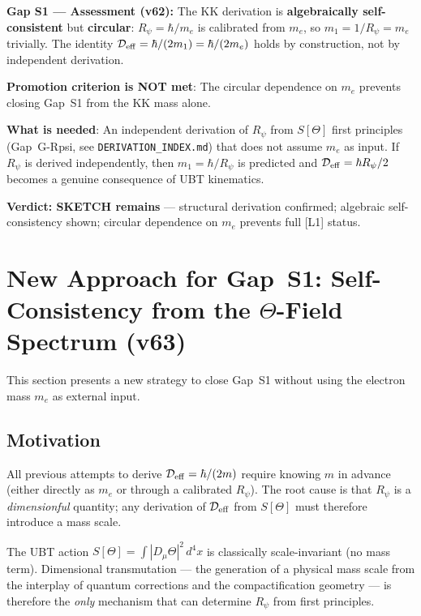 \documentclass[12pt]{article}
\theoremstyle{definition}
\theoremstyle{remark}
\begin{document}
\begin{gapbox}
\textbf{Gap S1 — Assessment (v62):}
The KK derivation is \textbf{algebraically self-consistent} but
\textbf{circular}: $R_\psi = \hbar/m_e$ is calibrated from $m_e$, so
$m_1 = 1/R_\psi = m_e$ trivially.  The identity
$\mathcal{D}_{\rm eff} = \hbar/(2m_1) = \hbar/(2m_e)$ holds by construction,
not by independent derivation.

\medskip
\textbf{Promotion criterion is NOT met}: The circular dependence on $m_e$
prevents closing Gap~S1 from the KK mass alone.

\medskip
\textbf{What is needed}: An independent derivation of $R_\psi$ from $S[\Theta]$
first principles (Gap~G-Rpsi, see \texttt{DERIVATION\_INDEX.md}) that does
not assume $m_e$ as input.  If $R_\psi$ is derived independently, then
$m_1 = \hbar/R_\psi$ is predicted and $\mathcal{D}_{\rm eff} = \hbar R_\psi/2$
becomes a genuine consequence of UBT kinematics.

\medskip
\textbf{Verdict: SKETCH remains} — structural derivation confirmed;
algebraic self-consistency shown; circular dependence on $m_e$ prevents
full [L1] status.
\end{gapbox}

\section{New Approach for Gap~S1: Self-Consistency from the $\Theta$-Field Spectrum (v63)}
\label{sec:s1_new_approach}

This section presents a new strategy to close Gap~S1 without using the
electron mass $m_e$ as external input.

\subsection{Motivation}

All previous attempts to derive $\mathcal{D}_{\rm eff} = \hbar/(2m)$ require
knowing $m$ in advance (either directly as $m_e$ or through a calibrated
$R_\psi$).  The root cause is that $R_\psi$ is a \emph{dimensionful} quantity;
any derivation of $\mathcal{D}_{\rm eff}$ from $S[\Theta]$ must therefore
introduce a mass scale.

The UBT action $S[\Theta] = \int |D_\mu\Theta|^2\,d^4x$ is classically
scale-invariant (no mass term).  Dimensional transmutation — the generation
of a physical mass scale from the interplay of quantum corrections and
the compactification geometry — is therefore the \emph{only} mechanism that
can determine $R_\psi$ from first principles.
\end{document}
